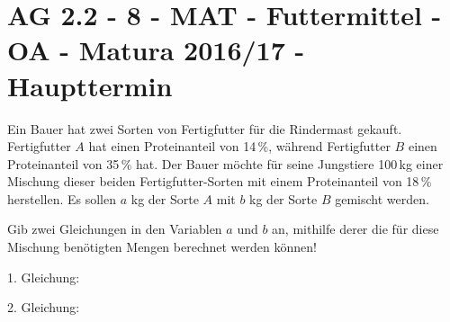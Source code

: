 \section{AG 2.2 - 8 - MAT - Futtermittel - OA - Matura 2016/17 - Haupttermin}

\begin{beispiel}[AG 2.2]{1} %
Ein Bauer hat zwei Sorten von Fertigfutter für die Rindermast gekauft. Fertigfutter $A$ hat einen Proteinanteil von 14\,\%, während Fertigfutter $B$ einen Proteinanteil von 35\,\% hat.
Der Bauer möchte für seine Jungstiere 100\,kg einer Mischung dieser beiden Fertigfutter-Sorten
mit einem Proteinanteil von 18\,\% herstellen. Es sollen $a$ kg der Sorte $A$ mit $b$ kg der Sorte $B$ gemischt werden.\leer

Gib zwei Gleichungen in den Variablen $a$ und $b$ an, mithilfe derer die für diese Mischung benötigten Mengen berechnet werden können!\leer


1. Gleichung:  \leer

2. Gleichung: 
\end{beispiel}
